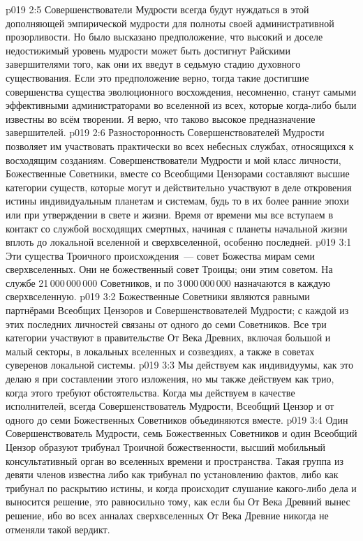 \vs p019 2:5 Совершенствователи Мудрости всегда будут нуждаться в этой дополняющей эмпирической мудрости для полноты своей административной прозорливости. Но было высказано предположение, что высокий и доселе недостижимый уровень мудрости может быть достигнут Райскими завершителями  того, как они их введут в седьмую стадию духовного существования. Если это предположение верно, тогда такие достигшие совершенства существа эволюционного восхождения, несомненно, станут самыми эффективными администраторами во вселенной из всех, которые когда\hyp{}либо были известны во всём творении. Я верю, что таково высокое предназначение завершителей.
\vs p019 2:6 \pc Разносторонность Совершенствователей Мудрости позволяет им участвовать практически во всех небесных службах, относящихся к восходящим созданиям. Совершенствователи Мудрости и мой класс личности, Божественные Советники, вместе со Всеобщими Цензорами составляют высшие категории существ, которые могут и действительно участвуют в деле откровения истины индивидуальным планетам и системам, будь то в их более ранние эпохи или при утверждении в свете и жизни. Время от времени мы все вступаем в контакт со службой восходящих смертных, начиная с планеты начальной жизни вплоть до локальной вселенной и сверхвселенной, особенно последней.
\vs p019 3:1 Эти существа Троичного происхождения~--- совет Божества мирам семи сверхвселенных. Они не  божественный совет Троицы; они  этим советом. На службе 21\,000\,000\,000 Советников, и по 3\,000\,000\,000 назначаются в каждую сверхвселенную.
\vs p019 3:2 Божественные Советники являются равными партнёрами Всеобщих Цензоров и Совершенствователей Мудрости; с каждой из этих последних личностей связаны от одного до семи Советников. Все три категории участвуют в правительстве От Века Древних, включая большой и малый секторы, в локальных вселенных и созвездиях, а также в советах суверенов локальной системы.
\vs p019 3:3 Мы действуем как индивидуумы, как это делаю я при составлении этого изложения, но мы также действуем как трио, когда этого требуют обстоятельства. Когда мы действуем в качестве исполнителей, всегда Совершенствователь Мудрости, Всеобщий Цензор и от одного до семи Божественных Советников объединяются вместе.
\vs p019 3:4 \pc Один Совершенствователь Мудрости, семь Божественных Советников и один Всеобщий Цензор образуют трибунал Троичной божественности, высший мобильный консультативный орган во вселенных времени и пространства. Такая группа из девяти членов известна либо как трибунал по установлению фактов, либо как трибунал по раскрытию истины, и когда происходит слушание какого\hyp{}либо дела и выносится решение, это равносильно тому, как если бы От Века Древний вынес решение, ибо во всех анналах сверхвселенных От Века Древние никогда не отменяли такой вердикт.
